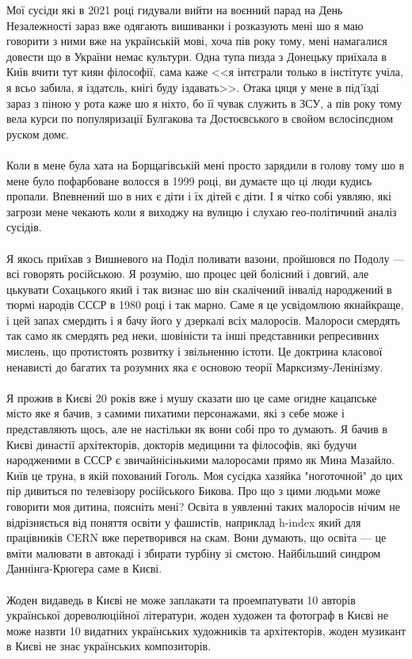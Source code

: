 Мої сусіди які в 2021 році гидували вийти на воєнний парад на День
Незалежності зараз вже одягають вишиванки і розказують мені шо я маю
говорити з ними вже на українській мові, хоча пів року тому, мені
намагалися довести що в України немає культури. Одна тупа пизда з
Донецьку приїхала в Київ вчити тут киян філософії, сама каже <<я інтєграли
только в інстітутє учіла, я всьо забила, я іздатєль, кнігі буду іздавать>>.
Отака цяця у мене в під'їзді зараз з піною у рота каже шо я ніхто, бо її
чувак служить в ЗСУ, а пів року тому вела курси по популяризації Булгакова
та Достоєвського в свойом вєлосіпєдном руском домє.
\\
\\
Коли в мене була хата на Борщагівській мені просто зарядили в голову
тому шо в мене було пофарбоване волосся в 1999 році, ви думаєте що
ці люди кудись пропали. Впевнений шо в них є діти і їх дітей є діти.
І я чітко собі уявляю, які загрози мене чекають коли я виходжу на вулицю
і слухаю гео-політичний аналіз сусідів.
\\
\\
Я якось приїхав з Вишневого на Поділ поливати вазони, пройшовся по Подолу ---
всі говорять російською. Я розумію, шо процес цей болісний і довгий, але
цькувати Сохацького який і так визнає шо він скалічений інвалід народжений
в тюрмі народів СССР в 1980 році і так марно. Саме я це усвідомлюю якнайкраще,
і цей запах смердить і я бачу його у дзеркалі всіх малоросів. Малороси смердять
так само як смердять ред неки, шовіністи та інші представники репресивних мислень,
що протистоять розвитку і звільненню істоти. Це доктрина класової ненависті до
багатих та розумних яка є основою теорії Марксизму-Ленінізму.
\\
\\
Я прожив в Києві 20 років вже і мушу сказати шо це саме огидне кацапське
місто яке я бачив, з самими пихатими персонажами, які з себе може і представляють
щось, але не настільки як вони собі про то думають. Я бачив в Києві династії
архітекторів, докторів медицини та філософів, які будучи народженими в СССР
є звичайнісінькими малоросами прямо як Мина Мазайло. Київ це труна, в якій
похований Гоголь. Моя сусідка хазяйка "ноготочной" до цих пір дивиться по
телевізору російського Бикова. Про що з цими людьми може говорити моя дитина,
поясніть мені? Освіта в уявленні таких малоросів нічим не відрізняється від
поняття освіти у фашистів, наприклад h-index який для працівників CERN вже
перетворився на скам. Вони думають, що освіта --- це вміти малювати в автокаді
і збирати турбіну зі смєтою. Найбільший синдром Даннінга-Крюгера саме в Києві.
\\
\\
Жоден видаведь в Києві не може заплакати та проемпатувати 10 авторів української дореволюційної літератури,
жоден художен та фотограф в Києві не може назвти 10 видатних українських художників та архітекторів,
жоден музикант в Києві не знає українських композиторів.

